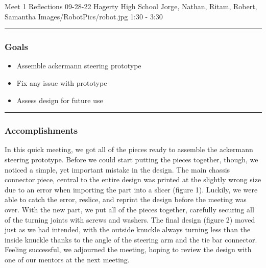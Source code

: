 \insertmeeting 
	{Meet 1 Reflections} 
	{09-28-22} 
	{Hagerty High School}
	{Jorge, Nathan, Ritam, Robert, Samantha}
	{Images/RobotPics/robot.jpg}
	{1:30 - 3:30}
	
\noindent\hfil\rule{\textwidth}{.4pt}\hfil
\subsubsection*{Goals}
\begin{itemize}
    \item Assemble ackermann steering prototype
    \item Fix any issue with prototype
    \item Assess design for future use



\end{itemize} 

\noindent\hfil\rule{\textwidth}{.4pt}\hfil

\subsubsection*{Accomplishments}
In this quick meeting, we got all of the pieces ready to assemble the ackermann steering prototype. Before we could start putting the pieces together, though, we noticed a simple, yet important mistake in the design. The main chassis connector piece, central to the entire design was printed at the slightly wrong size due to an error when importing the part into a slicer (figure 1). Luckily, we were able to catch the error, reslice, and reprint the design before the meeting was over. With the new part, we put all of the pieces together, carefully securing all of the turning joints with screws and washers. The final design (figure 2) moved just as we had intended, with the outside knuckle always turning less than the inside knuckle thanks to the angle of the steering arm and the tie bar connector. Feeling successful, we adjourned the meeting, hoping to review the design with one of our mentors at the next meeting.


 

